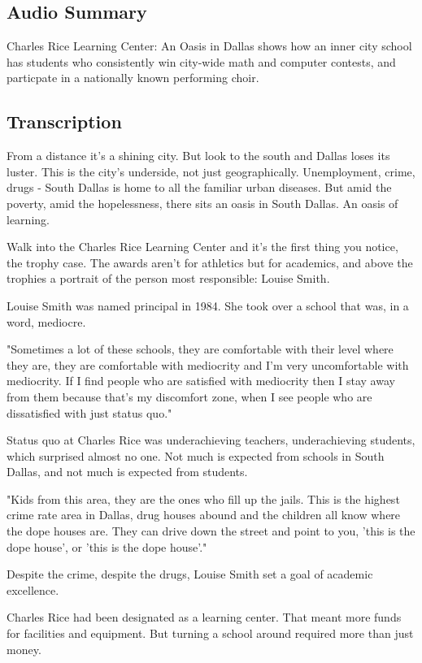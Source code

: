 \subsection{Audio Summary}

Charles Rice Learning Center: An Oasis in Dallas shows how an inner city school has students who consistently win city-wide math and computer contests, and particpate in a nationally known performing choir.

\subsection{Transcription}

From a distance it's a shining city. But look to the south and Dallas loses its luster. This is the city's underside, not just geographically. Unemployment, crime, drugs - South Dallas is home to all the familiar urban diseases. But amid the poverty, amid the hopelessness, there sits an oasis in South Dallas. An oasis of learning.

Walk into the Charles Rice Learning Center and it's the first thing you notice, the trophy case. The awards aren't for athletics but for academics, and above the trophies a portrait of the person most responsible: Louise Smith.

Louise Smith was named principal in 1984. She took over a school that was, in a word, mediocre.

"Sometimes a lot of these schools, they are comfortable with their level where they are, they are comfortable with mediocrity and I'm very uncomfortable with mediocrity. If I find people who are satisfied with mediocrity then I stay away from them because that's my discomfort zone, when I see people who are dissatisfied with just status quo."

Status quo at Charles Rice was underachieving teachers, underachieving students, which surprised almost no one. Not much is expected from schools in South Dallas, and not much is expected from students.

"Kids from this area, they are the ones who fill up the jails. This is the highest crime rate area in Dallas, drug houses abound and the children all know where the dope houses are. They can drive down the street and point to you, 'this is the dope house', or 'this is the dope house'."

Despite the crime, despite the drugs, Louise Smith set a goal of academic excellence.

Charles Rice had been designated as a learning center. That meant more funds for facilities and equipment. But turning a school around required more than just money.

